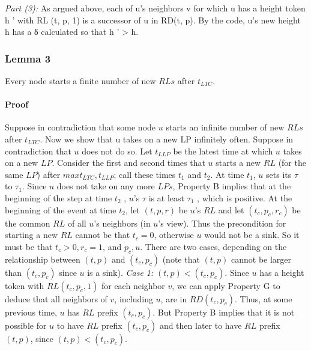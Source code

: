 \documentclass{article}
\begin{document}
\textit{Part (3):}
As argued above, each of u’s neighbors v for which u has a height token h ' with RL (t, p, 1) is a successor of u in RD(t, p). By the code, u’s new height h has a δ calculated so that h ' > h.


\subsubsection{Lemma 3}
Every node starts a finite number of new $RLs$ after $t_{LTC}$.

\paragraph{Proof}
Suppose in contradiction that some node $u$ starts an infinite number of new $RLs$ after $t_{LTC}$.
Now we show that u takes on a new LP infinitely often. Suppose in contradiction that $u$ does not do so. Let $t_{LLP}$ be the latest time at which $u$ takes on a new $LP$. Consider the first and second times that $u$ starts a new $RL$ (for the same $LP$) after $max{t_{LTC} ,t_{LLP} }$; call these times $t_1$ and $t_2$.
At time $t_1$, $u$ sets its $\tau $ to $\tau _1$. Since $u$ does not take on any more $LPs$, Property B implies that at the beginning of the step at time $t_2$ , $u$’s $\tau $ is at least $\tau _1$ , which is positive.
At the beginning of the event at time $t_2$, let $(t, p, r)$ be $u$’s $RL$ and let $(t_c, p_c, r_c)$ be the common $RL$ of all $u$’s neighbors (in $u$’s view). Thus the precondition for starting a new $RL$ cannot be that $t_c = 0$, otherwise $u$ would not be a sink. So it must be that $t_c > 0, r_c = 1$, and $p_c , u$.
There are two cases, depending on the relationship between $(t, p)$ and $(t_c, p_c)$ (note that $(t, p)$ cannot be larger than $(t_c, p_c)$ since $u$ is a sink).
\textit{Case 1:}
$(t, p) < (t_c, p_c)$. Since $u$ has a height token with $RL(t_c, p_c, 1)$ for each neighbor $v$, we can apply Property G to deduce that all neighbors of $v$, including $u$, are in $RD(t_c, p_c)$. Thus, at some previous time, $u$ has $RL$ prefix $(t_c, p_c)$. But Property B implies that it is not possible for $u$ to have $RL$ prefix $(t_c, p_c)$ and then later to have $RL$ prefix $(t, p)$, since $(t, p) < (t_c, p_c)$.
\end{document}
